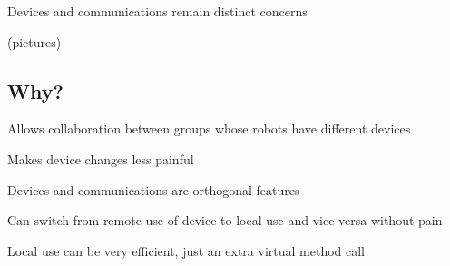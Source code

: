 Devices and communications remain distinct concerns

(pictures)


\subsection{Why?}

Allows collaboration between groups whose robots have different devices

Makes device changes less painful

Devices and communications are orthogonal features

Can switch from remote use of device to local use and vice versa without pain

Local use can be very efficient, just an extra virtual method call

